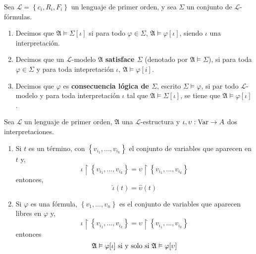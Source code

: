 \documentclass[12pt]{report}
\newcounter{it}
\theoremstyle{largebreak}
\newcommand\cf[3]{\ensuremath{#1:#2\rightarrow#3}}
\begin{document}
    \begin{mydef}
        Sea $\mathcal{L}=\left\{c_i,R_i,F_i \right\}$ un lenguaje de primer orden, y sea $\Sigma$ un conjunto de $\mathcal{L}$-fórmulas.
        \begin{enumerate}[label=(\textit{\arabic*})]
            \item Decimos que $\mathfrak{A}\vDash\Sigma[\iota]$ si para todo $\varphi\in\Sigma$, $\mathfrak{A}\vDash\varphi[\iota]$, siendo $\iota$ una interpretación.
            \item Decimos que un $\mathcal{L}$-modelo $\mathfrak{A}$ \textbf{satisface $\Sigma$} (denotado por $\mathfrak{A}\vDash\Sigma$), si para toda $\varphi\in\Sigma$ y para toda intepretación $\iota$, $\mathfrak{A}\vDash\varphi[i]$.
            \item Decimos que $\varphi$ es \textbf{consecuencia lógica de $\Sigma$}, escrito $\Sigma\vDash\varphi$, si par todo $\mathcal{L}$-modelo y para toda interpretación $\iota$ tal que $\mathfrak{A}\vDash\Sigma[\iota]$, se tiene que $\mathfrak{A}\vDash\varphi[\iota]$.
        \end{enumerate}
    \end{mydef}

    \begin{lema}
        Sea $\mathcal{L}$ un lenguaje de primer orden, $\mathfrak{A}$ una $\mathcal{L}$-estructura y $\cf{\iota,\upsilon}{\textup{Var}}{A}$ dos interpretaciones.
        \begin{enumerate}[label=(\textit{\arabic*})]
            \item Si $t$ es un término, con $\left\{v_{ i_1},...,v_{ i_k} \right\}$ el conjunto de variables que aparecen en $t$ y,
            \begin{equation*}
                \iota\upharpoonright\left\{v_{ i_1},...,v_{ i_k} \right\}=\upsilon\upharpoonright\left\{v_{ i_1},...,v_{ i_k} \right\}
            \end{equation*}
            entonces,
            \begin{equation*}
                \hat{\iota}(t)=\hat{\upsilon}(t)
            \end{equation*}
            \item Si $\varphi$ es una fórmula, $\left\{v_1,...,v_n \right\}$ es el conjunto de variables que aparecen libres en $\varphi$ y,
            \begin{equation*}
                \iota\upharpoonright\left\{v_{ i_1},...,v_{ i_k} \right\}=\upsilon\upharpoonright\left\{v_{ i_1},...,v_{ i_k} \right\}
            \end{equation*}
            entonces
            \begin{equation*}
                \mathfrak{A}\vDash\varphi[\iota]\textup{ si y solo si }\mathfrak{A}\vDash\varphi[\upsilon]
            \end{equation*}
        \end{enumerate}
    \end{lema}
\end{document}
